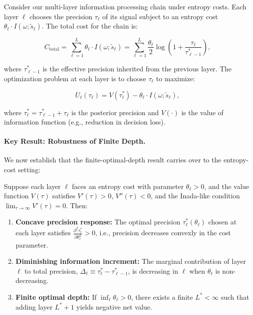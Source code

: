 Consider our multi-layer information processing chain under entropy costs. Each layer $\ell$ chooses the precision $\tau_\ell$ of its signal subject to an entropy cost $\theta_\ell \cdot I(\omega; \tilde{s}_\ell)$. The total cost for the chain is:

\begin{equation}
    C_{\text{total}} = \sum_{\ell=1}^{L} \theta_\ell \cdot I(\omega; \tilde{s}_\ell) = \sum_{\ell=1}^{L} \frac{\theta_\ell}{2} \log\left(1 + \frac{\tau_\ell}{\tau_{\ell-1}^{*}}\right),
\end{equation}

where $\tau_{\ell-1}^{*}$ is the effective precision inherited from the previous layer. The optimization problem at each layer is to choose $\tau_\ell$ to maximize:

\begin{equation}
    U_\ell(\tau_\ell) = V(\tau_\ell^{*}) - \theta_\ell \cdot I(\omega; \tilde{s}_\ell),
\end{equation}

where $\tau_\ell^{*} = \tau_{\ell-1}^{*} + \tau_\ell$ is the posterior precision and $V(\cdot)$ is the value of information function (e.g., reduction in decision loss).

\paragraph{Key Result: Robustness of Finite Depth.} We now establish that the finite-optimal-depth result carries over to the entropy-cost setting:

\begin{proposition}
\label{prop:finite_depth_entropy}
Suppose each layer $\ell$ faces an entropy cost with parameter $\theta_\ell > 0$, and the value function $V(\tau)$ satisfies $V'(\tau) > 0$, $V''(\tau) < 0$, and the Inada-like condition $\lim_{\tau \to \infty} V'(\tau) = 0$. Then:
\begin{enumerate}
    \item[(i)] \textbf{Concave precision response:} The optimal precision $\tau_\ell^{*}(\theta_\ell)$ chosen at each layer satisfies $\frac{\partial^2 \tau_\ell^{*}}{\partial \theta_\ell^2} > 0$, i.e., precision decreases convexly in the cost parameter.
    \item[(ii)] \textbf{Diminishing information increment:} The marginal contribution of layer $\ell$ to total precision, $\Delta_\ell \equiv \tau_\ell^{*} - \tau_{\ell-1}^{*}$, is decreasing in $\ell$ when $\theta_\ell$ is non-decreasing.
    \item[(iii)] \textbf{Finite optimal depth:} If $\inf_\ell \theta_\ell > 0$, there exists a finite $L^{*} < \infty$ such that adding layer $L^{*}+1$ yields negative net value.
\end{enumerate}
\end{proposition}

